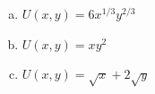 \documentclass[11pt]{article}
\begin{document}
\begin{enumerate}
\begin{enumerate}[(a)]
      \vspace*{80mm}
      \item $U(x,y) = 6x^{1/3}y^{2/3}$
      
      \vspace*{80mm}
      \item $U(x,y) = xy^2$
      
      \vspace*{100mm}
      \item $U(x,y) = \sqrt{x} + 2\sqrt{y}$
    \end{enumerate}
\end{enumerate}
\end{document}
